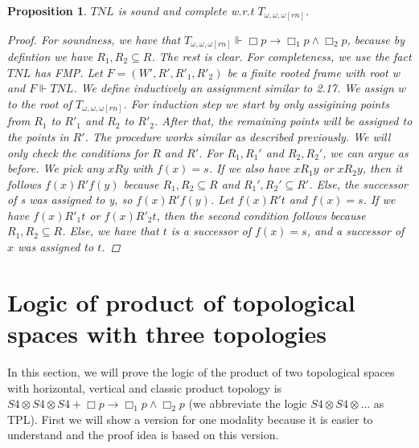 \documentclass[12pt, a4paper]{scrartcl}
\newtheorem{proposition}[definition]{Proposition}
\begin{document}
\begin{proposition}
    $TNL$ is sound and complete w.r.t $T_{\omega,\omega,\omega[rn]}$.

    \begin{proof}
    For soundness, we have that $T_{\omega,\omega,\omega[rn]} \Vdash \Box p \rightarrow \Box_1 p \land \Box_2p$, because by defintion we have $R_1,R_2 \subseteq R$. The rest is clear.
    For completeness, we use the fact $TNL$ has FMP. Let $F = (W',R', R'_1, R'_2)$ be a finite rooted frame with root w and $F \Vdash TNL$. We define inductively an
    assignment similar to 2.17. We assign $w$ to the root of $T_{\omega,\omega,\omega[rn]}$. For induction step we start by only assigining points from $R_1$ to $R'_1$ and $R_2$ to $R'_2$. After that, the remaining points will be assigned to the points in $R'$.
    The procedure works similar as described previously. \newline
    We will only check the conditions for $R$ and $R'$. For $R_1, R_1'$ and $R_2, R_2'$, we can argue as before. We pick any $xRy$ with $f(x) = s$. 
    If we also have $xR_1y$ or $xR_2y$, then it follows $f(x)R' f(y)$ because $R_1, R_2 \subseteq R$ and $R_1', R_2' \subseteq R'$. Else, the successor of s was assigned to y, so $f(x)R'f(y)$. \newline
    Let $f(x)R't$ and $f(x) = s$. If we have $f(x) R'_1 t$ or $f(x) R'_2 t$, then the second condition follows because $R_1,R_2 \subseteq R$.
    Else, we have that $t$ is a successor of $f(x) = s$, and a successor of $x$ was assigned to $t$.
    \end{proof}
        
\end{proposition}




\clearpage

\section{Logic of product of topological spaces with three topologies}
In this section, we will prove the logic of the product of two topological spaces with horizontal, vertical and classic product topology is 
$S4 \otimes S4 \otimes S4 + \Box p \rightarrow \Box_1 p \land \Box_2 p$ (we abbreviate the logic $S4 \otimes S4 \otimes ...$ as TPL). First we will show a version for one modality
because it is easier to understand and the proof idea is based on this version.
\end{document}
